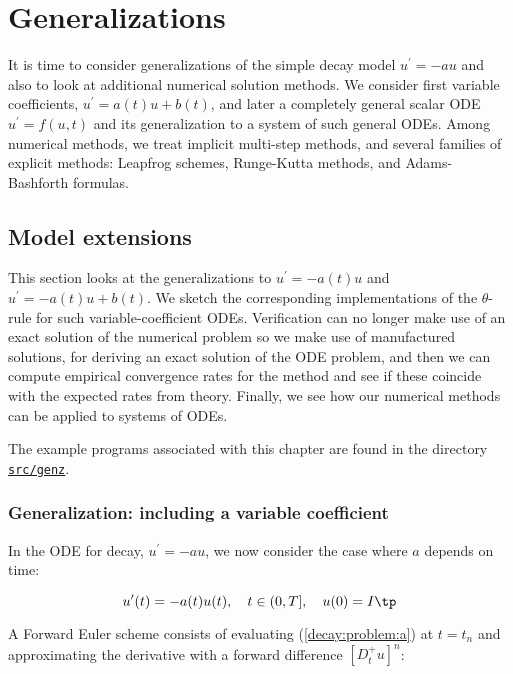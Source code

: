 \documentclass[graybox,sectrefs,envcountresetchap,open=right,final]{svmonodo}
\begin{document}
\chapter{Generalizations}

It is time to consider generalizations of the simple decay model
$u^{\prime}=-au$ and also to look at additional numerical solution
methods.  We consider first variable coefficients, $u^{\prime}=a(t)u +
b(t)$, and later a completely general scalar ODE $u^{\prime}=f(u,t)$
and its generalization to a system of such general ODEs.  Among
numerical methods, we treat implicit multi-step methods, and several
families of explicit methods: Leapfrog schemes, Runge-Kutta methods,
and Adams-Bashforth formulas.

\section{Model extensions}

This section looks at the generalizations to $u^{\prime}=-a(t)u$
and $u^{\prime}=-a(t)u + b(t)$. We sketch the corresponding
implementations of the $\theta$-rule for such variable-coefficient ODEs.
Verification can no longer make use of an exact solution of the
numerical problem so we make use of manufactured solutions,
for deriving an exact solution of the ODE problem, and then we can
compute empirical convergence rates for the method and see if these
coincide with the expected rates from theory.
Finally, we see how our numerical methods can be applied to systems
of ODEs.

The example programs associated with this chapter are found in
the directory \href{{http://tinyurl.com/ofkw6kc/genz}}{\nolinkurl{src/genz}}.


\subsection{Generalization: including a variable coefficient}

In the ODE for decay, $u^{\prime}=-au$, we now consider the case where $a$
depends on time:

\begin{equation}
u^{\prime}(t) = -a(t)u(t),\quad t\in (0,T],\quad u(0)=I \tp
\label{decay:problem:a}
\end{equation}

A Forward Euler scheme consists of evaluating (\ref{decay:problem:a})
at $t=t_n$ and approximating the derivative with a forward
difference $[D^+_t u]^n$:
\end{document}
